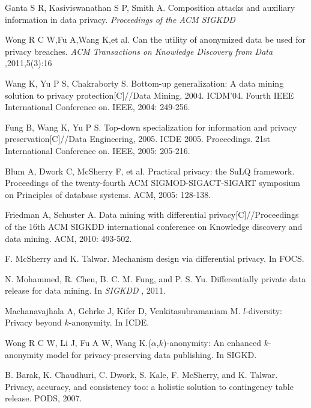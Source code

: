 \begin{thebibliography}{1}
 Ganta S R, Kasiviswanathan S P, Smith A. Composition attacks and auxiliary information in data privacy. {\it Proceedings of the ACM SIGKDD}

 Wong R C W,Fu A,Wang K,et al. Can the utility of anonymized data be used for privacy breaches. {\it ACM Transactions on Knowledge Discovery from Data },2011,5(3):16

Wang K, Yu P S, Chakraborty S. Bottom-up generalization: A data mining solution to privacy protection[C]//Data Mining, 2004. ICDM'04. Fourth IEEE International Conference on. IEEE, 2004: 249-256.

Fung B, Wang K, Yu P S. Top-down specialization for information and privacy preservation[C]//Data Engineering, 2005. ICDE 2005. Proceedings. 21st International Conference on. IEEE, 2005: 205-216.

Blum A, Dwork C, McSherry F, et al. Practical privacy: the SuLQ framework. Proceedings of the twenty-fourth ACM SIGMOD-SIGACT-SIGART symposium on Principles of database systems. ACM, 2005: 128-138.

Friedman A, Schuster A. Data mining with differential privacy[C]//Proceedings of the 16th ACM SIGKDD international conference on Knowledge discovery and data mining. ACM, 2010: 493-502.

 F. McSherry and K. Talwar. Mechanism design via differential privacy. In FOCS.

 N. Mohammed, R. Chen, B. C. M. Fung, and P. S. Yu. Differentially private data release for data mining. In {\it SIGKDD }, 2011.


 Machanavajhala A, Gehrke J, Kifer D, Venkitasubramaniam M. $l$-diversity: Privacy beyond $k$-anonymity. In ICDE.


 Wong R C W, Li J, Fu A W, Wang K.($\alpha$,$k$)-anonymity: An enhanced $k$-anonymity model for privacy-preserving data publishing. In SIGKD.





B. Barak, K. Chaudhuri, C. Dwork, S. Kale, F. McSherry, and K. Talwar. Privacy, accuracy, and consistency too: a holistic solution to contingency table release. PODS, 2007.






\end{thebibliography}
